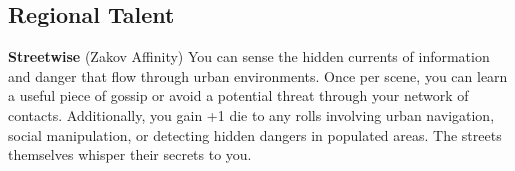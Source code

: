 \documentclass[11pt]{article}
\newcommand{\subregion}[1]{\subsection*{#1}}
\begin{document}
\begin{multicols}{2}
\subregion{Regional Talent}

\textbf{Streetwise} (Zakov Affinity)
You can sense the hidden currents of information and danger that flow through urban environments. Once per scene, you can learn a useful piece of gossip or avoid a potential threat through your network of contacts. Additionally, you gain +1 die to any rolls involving urban navigation, social manipulation, or detecting hidden dangers in populated areas. The streets themselves whisper their secrets to you.

\end{multicols}
\end{document}
